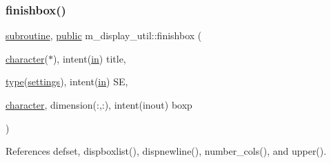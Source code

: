 \subsubsection{\texorpdfstring{finishbox()}{finishbox()}}
{\footnotesize\ttfamily \hyperlink{M__stopwatch_83_8txt_acfbcff50169d691ff02d4a123ed70482}{subroutine}, \hyperlink{M__stopwatch_83_8txt_a2f74811300c361e53b430611a7d1769f}{public} m\+\_\+display\+\_\+util\+::finishbox (\begin{DoxyParamCaption}\item[{\hyperlink{option__stopwatch_83_8txt_abd4b21fbbd175834027b5224bfe97e66}{character}($\ast$), intent(\hyperlink{M__journal_83_8txt_afce72651d1eed785a2132bee863b2f38}{in})}]{title,  }\item[{\hyperlink{stop__watch_83_8txt_a70f0ead91c32e25323c03265aa302c1c}{type}(\hyperlink{structm__display__util_1_1settings}{settings}), intent(\hyperlink{M__journal_83_8txt_afce72651d1eed785a2132bee863b2f38}{in})}]{SE,  }\item[{\hyperlink{option__stopwatch_83_8txt_abd4b21fbbd175834027b5224bfe97e66}{character}, dimension(\+:,\+:), intent(inout)}]{boxp }\end{DoxyParamCaption})}



References defset, dispboxlist(), dispnewline(), number\+\_\+cols(), and upper().

\mbox{\label{namespacem__display__util_a04585c4fe921b2423a6cfc1ad21a40b7}} 
